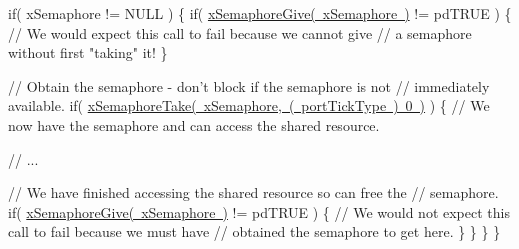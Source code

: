 \begin{DoxyPre}   if( xSemaphore != NULL )
   \{
       if( \mbox{\hyperlink{semphr_8h_aae55761cabfa9bf85c8f4430f78c0953}{xSemaphoreGive( xSemaphore )}} != pdTRUE )
       \{
           // We would expect this call to fail because we cannot give
           // a semaphore without first "taking" it!
       \}\end{DoxyPre}



\begin{DoxyPre}       // Obtain the semaphore - don't block if the semaphore is not
       // immediately available.
       if( \mbox{\hyperlink{semphr_8h_af116e436d2a5ae5bd72dbade2b5ea930}{xSemaphoreTake( xSemaphore, ( portTickType ) 0 )}} )
       \{
           // We now have the semaphore and can access the shared resource.\end{DoxyPre}



\begin{DoxyPre}           // ...\end{DoxyPre}



\begin{DoxyPre}           // We have finished accessing the shared resource so can free the
           // semaphore.
           if( \mbox{\hyperlink{semphr_8h_aae55761cabfa9bf85c8f4430f78c0953}{xSemaphoreGive( xSemaphore )}} != pdTRUE )
           \{
               // We would not expect this call to fail because we must have
               // obtained the semaphore to get here.
           \}
       \}
   \}
\}
\end{DoxyPre}
 